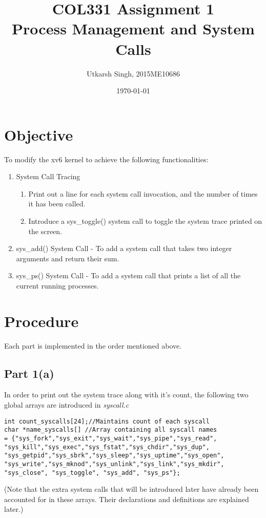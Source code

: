 \documentclass[a4paper]{article}
\title{COL331 Assignment 1 \\
		\large Process Management and System Calls}
\author{Utkarsh Singh, 2015ME10686}
\date{\today}
\begin{document}
\maketitle

\section*{Objective}
To modify the xv6 kernel to achieve the following functionalities:
\begin{enumerate}
	\item System Call Tracing
    \begin{enumerate}
    	\item Print out a line for each system call invocation, and the number of times it has been called.
        \item Introduce a sys\_toggle() system call to toggle the system trace printed on the screen.
    \end{enumerate}
    \item sys\_add() System Call - To add a system call that takes two integer arguments and return their sum.
    \item sys\_ps() System Call - To add a system call that prints a list of all the current running processes.
\end{enumerate}
\section*{Procedure}
Each part is implemented in the order mentioned above.

\subsection*{Part 1(a)}
In order to print out the system trace along with it's count, the following two global arrays are introduced in \textit{syscall.c}
\newline

\begin{lstlisting}
int count_syscalls[24];//Maintains count of each syscall
char *name_syscalls[] //Array containing all syscall names
= {"sys_fork","sys_exit","sys_wait","sys_pipe","sys_read",
"sys_kill","sys_exec","sys_fstat","sys_chdir","sys_dup",
"sys_getpid","sys_sbrk","sys_sleep","sys_uptime","sys_open",
"sys_write","sys_mknod","sys_unlink","sys_link","sys_mkdir",
"sys_close", "sys_toggle", "sys_add", "sys_ps"};
\end{lstlisting}
\noindent (Note that the extra system calls that will be introduced later have already been accounted for in these arrays. Their declarations and definitions are explained later.)
\end{document}
